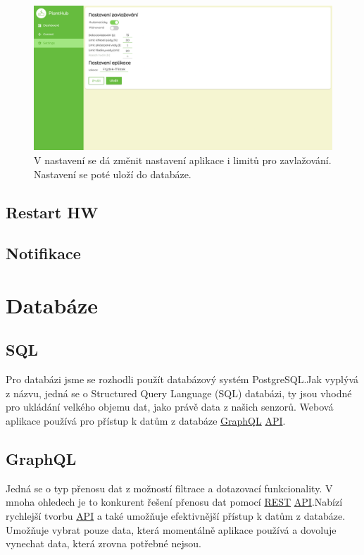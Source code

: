 \documentclass[12pt,a4paper]{article}
\begin{document}
\begin{figure}[h]
	\centering
	\includegraphics[width=\linewidth]{web-ui-settings.png}
	\caption{V nastavení se dá změnit nastavení aplikace i limitů pro
		zavlažování. Nastavení se poté uloží do databáze.}
\end{figure}

\subsection{Restart HW}
\subsection{Notifikace}

\clearpage

\section{Databáze}

\subsection{SQL}


Pro databázi jsme se rozhodli použít databázový systém PostgreSQL.\@ Jak vyplývá z názvu, jedná se o Structured Query Language (SQL) databázi, ty jsou vhodné pro ukládání velkého objemu dat, jako právě data z našich senzorů. Webová aplikace používá pro přístup k datům z databáze \underline{\ac{GraphQL}} \space \underline{\ac{API}}.\@

\subsection{GraphQL}

Jedná se o typ přenosu dat z možností filtrace a dotazovací funkcionality. V mnoha ohledech je to konkurent řešení přenosu dat pomocí \underline{\ac{REST}} \space \underline{\ac{API}}.\@ Nabízí rychlejší tvorbu \underline{\ac{API}} \space a také umožňuje efektivnější přístup k datům z databáze. Umožňuje vybrat pouze data, která momentálně aplikace používá a dovoluje vynechat data, která zrovna potřebné nejsou.
\end{document}
